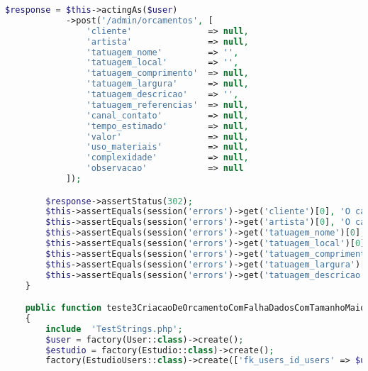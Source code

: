 \begin{lstlisting}[language=PHP, caption= Scripts de teste de Criação de Orçamentos, nolol,
label={code:CriacaoDeOrcamentoTest}]
        $response = $this->actingAs($user)
            ->post('/admin/orcamentos', [
                'cliente'               => null,
                'artista'               => null,
                'tatuagem_nome'         => '',
                'tatuagem_local'        => '',
                'tatuagem_comprimento'  => null,
                'tatuagem_largura'      => null,
                'tatuagem_descricao'    => '',
                'tatuagem_referencias'  => null,
                'canal_contato'         => null,
                'tempo_estimado'        => null,
                'valor'                 => null,
                'uso_materiais'         => null,
                'complexidade'          => null,
                'observacao'            => null
            ]);

        $response->assertStatus(302);
        $this->assertEquals(session('errors')->get('cliente')[0], 'O campo cliente é obrigatório.');
        $this->assertEquals(session('errors')->get('artista')[0], 'O campo artista é obrigatório.');
        $this->assertEquals(session('errors')->get('tatuagem_nome')[0], 'O campo tatuagem nome é obrigatório.');
        $this->assertEquals(session('errors')->get('tatuagem_local')[0], 'O campo tatuagem local é obrigatório.');
        $this->assertEquals(session('errors')->get('tatuagem_comprimento')[0], 'O campo tatuagem comprimento é obrigatório.');
        $this->assertEquals(session('errors')->get('tatuagem_largura')[0], 'O campo tatuagem largura é obrigatório.');
        $this->assertEquals(session('errors')->get('tatuagem_descricao')[0], 'O campo tatuagem descricao é obrigatório.');
    }

    public function teste3CriacaoDeOrcamentoComFalhaDadosComTamanhoMaiorQueOSuportado()
    {
        include  'TestStrings.php';
        $user = factory(User::class)->create();
        $estudio = factory(Estudio::class)->create();
        factory(EstudioUsers::class)->create(['fk_users_id_users' => $user->id, 'fk_estudio_id_estudio' => $estudio->id_estudio]);


\end{lstlisting}
